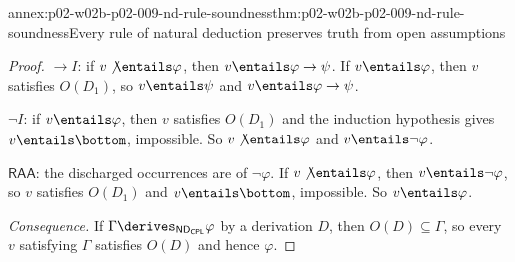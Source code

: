 \begin{annexitem}{annex:p02-w02b-p02-009-nd-rule-soundness}{thm:p02-w02b-p02-009-nd-rule-soundness}{Every rule of natural deduction preserves truth from open assumptions}
\begin{proof}
\(\to I\): if \(v\not\entails\varphi\), then \(v\entails\varphi\to\psi\).
If \(v\entails\varphi\), then \(v\) satisfies \(O(D_1)\), so
\(v\entails\psi\) and \(v\entails\varphi\to\psi\).

\(\neg I\): if \(v\entails\varphi\), then \(v\) satisfies \(O(D_1)\) and the
induction hypothesis gives \(v\entails\bottom\), impossible.  So
\(v\not\entails\varphi\) and \(v\entails\neg\varphi\).

\(\mathsf{RAA}\): the discharged occurrences are of \(\neg\varphi\).  If
\(v\not\entails\varphi\), then \(v\entails\neg\varphi\), so \(v\) satisfies
\(O(D_1)\) and \(v\entails\bottom\), impossible.  So \(v\entails\varphi\).

\emph{Consequence.}  If \(\Gamma\derives_{\mathsf{ND}_{\mathsf{CPL}}}\varphi\)
by a derivation \(D\), then \(O(D)\subseteq\Gamma\), so every \(v\) satisfying
\(\Gamma\) satisfies \(O(D)\) and hence \(\varphi\).
\end{proof}
\end{annexitem}

